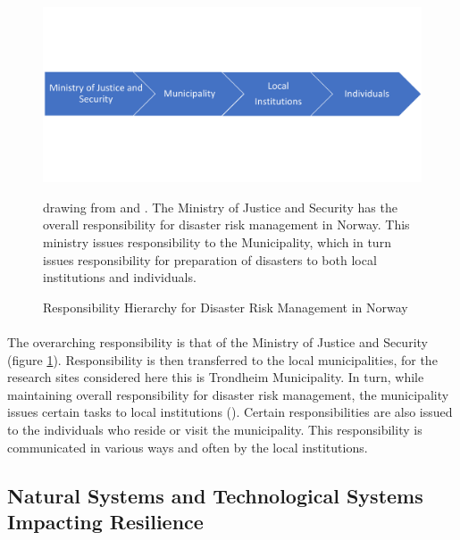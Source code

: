 \begin{figure} [h]
    \centering
    \includegraphics[width=1\textwidth]{fig_theory/responsibility drm -short.png}
    \caption{Responsibility Hierarchy for Disaster Risk Management in Norway}{ drawing from \cite{hanssen_saksframlegg_2013} and \cite{rasanen_conceptualizing_2020}. The Ministry of Justice and Security has the overall responsibility for disaster risk management in Norway. This ministry issues responsibility to the Municipality, which in turn issues responsibility for preparation of disasters to both local institutions and individuals. }
    \label{fig:drm_responsibility}
\end{figure}
\paragraph{}
The overarching responsibility is that of the Ministry of Justice and Security (figure \ref{fig:drm_responsibility}). Responsibility is then transferred to the local municipalities, for the research sites considered here this is Trondheim Municipality. In turn, while maintaining overall responsibility for disaster risk management, the municipality issues certain tasks to local institutions (\cite{hanssen_saksframlegg_2013}). Certain responsibilities are also issued to the individuals who reside or visit the municipality. This responsibility is communicated in various ways and often by the local institutions. 





\subsection{Natural Systems and Technological Systems Impacting Resilience } \label{theory-nature-tech-resilience}

